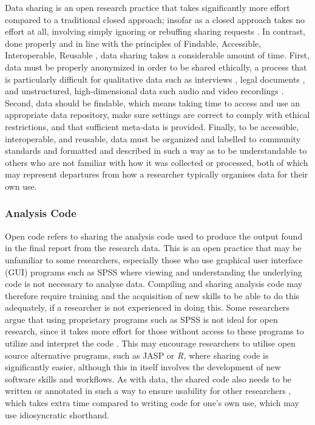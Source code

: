 \documentclass[meta, authordate]{jote-new-article}
\begin{document}
Data sharing is an open research practice that takes significantly more effort compared to a traditional closed approach; insofar as a closed approach takes no effort at all, involving simply ignoring or rebuffing sharing requests \parencites{Gabelica2022}. In contrast, done properly and in line with the principles of Findable, Accessible, Interoperable, Reusable \parencites[FAIR][]{Wilkinson2016}, data sharing takes a considerable amount of time. First, data must be properly anonymized in order to be shared ethically, a process that is particularly difficult for qualitative data such as interviews \parencites{Saunders2015}, legal documents \parencites{Csányi2021}, and unstructured, high-dimensional data such audio and video recordings \parencites{Weitzenboeck2022}. Second, data should be findable, which means taking time to access and use an appropriate data repository, make sure settings are correct to comply with ethical restrictions, and that sufficient meta-data is provided. Finally, to be accessible, interoperable, and reusable, data must be organized and labelled to community standards and formatted and described in such a way as to be understandable to others who are not familiar with how it was collected or processed, both of which may represent departures from how a researcher typically organises data for their own use.



\subsubsection{Analysis Code}



Open code refers to sharing the analysis code used to produce the output found in the final report from the research data. This is an open practice that may be unfamiliar to some researchers, especially those who use graphical user interface (GUI) programs such as SPSS where viewing and understanding the underlying code is not necessary to analyse data. Compiling and sharing analysis code may therefore require training and the acquisition of new skills to be able to do this adequately, if a researcher is not experienced in doing this. Some researchers argue that using proprietary programs such as SPSS is not ideal for open research, since it takes more effort for those without access to these programs to utilize and interpret the code \parencites{Obels2020}. This may encourage researchers to utilise open source alternative programs, such as JASP or \emph{R, }where sharing code is significantly easier, although this in itself involves the development of new software skills and workflows. As with data, the shared code also needs to be written or annotated in such a way to ensure usability for other researchers \parencites{Obels2020}, which takes extra time compared to writing code for one’s own use, which may use idiosyncratic shorthand.
\end{document}

